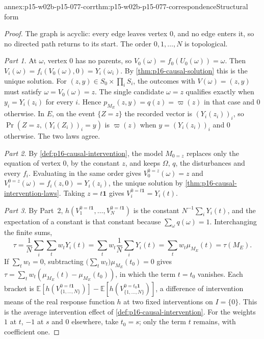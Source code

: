 \begin{annexitem}{annex:p15-w02b-p15-077-corr}{thm:p15-w02b-p15-077-correspondence}{Structural form}
\begin{proof}
The graph is acyclic: every edge leaves vertex \(0\), and no edge enters
it, so no directed path returns to its start. The order
\(0,1,\ldots,N\) is topological.

\emph{Part 1.} At \(\omega\), vertex \(0\) has no parents, so
\(V_0(\omega)=f_0(U_0(\omega))=\omega\). Then
\(V_i(\omega)=f_i(V_0(\omega),0)=Y_i(\omega_i)\). By
\cref{thm:p16-causal-solution} this is the unique solution. For
\((z,y)\in S_0\times\prod_iS_i\), the outcomes with
\(V(\omega)=(z,y)\) must satisfy \(\omega=V_0(\omega)=z\). The single
candidate \(\omega=z\) qualifies exactly when \(y_i=Y_i(z_i)\) for every
\(i\). Hence \(p_{M_E}(z,y)=q(z)=\varpi(z)\) in that case and \(0\)
otherwise. In \(E\), on the event \(\{Z=z\}\) the recorded vector is
\((Y_i(z_i))_i\), so
\(\Pr(Z=z,(Y_i(Z_i))_i=y)\) is \(\varpi(z)\) when
\(y=(Y_i(z_i))_i\) and \(0\) otherwise. The two laws agree.

\emph{Part 2.} By \cref{def:p16-causal-intervention}, the model
\(M_{0=z}\) replaces only the equation of vertex \(0\), by the constant
\(z\), and keeps \(\Omega\), \(q\), the disturbances and every \(f_i\).
Evaluating in the same order gives \(V_0^{0=z}(\omega)=z\) and
\(V_i^{0=z}(\omega)=f_i(z,0)=Y_i(z_i)\), the unique solution by
\cref{thm:p16-causal-intervention-laws}. Taking \(z=t\mathbf 1\) gives
\(V_i^{0=t\mathbf 1}=Y_i(t)\).

\emph{Part 3.} By Part~2,
\(h(V_1^{0=t\mathbf 1},\ldots,V_N^{0=t\mathbf 1})\) is the constant
\(N^{-1}\sum_iY_i(t)\), and the expectation of a constant is that constant
because \(\sum_\omega q(\omega)=1\). Interchanging the finite sums,
\[
 \tau=\frac1N\sum_i\sum_tw_tY_i(t)
     =\sum_tw_t\frac1N\sum_iY_i(t)=\sum_tw_t\mu_{M_E}(t)=\tau(M_E).
\]
If \(\sum_tw_t=0\), subtracting
\(\bigl(\sum_tw_t\bigr)\mu_{M_E}(t_0)=0\) gives
\(\tau=\sum_tw_t(\mu_{M_E}(t)-\mu_{M_E}(t_0))\), in which the term
\(t=t_0\) vanishes. Each bracket is
\(\mathbb E[h(V^{0=t\mathbf 1}_{\{1,\ldots,N\}})]
 -\mathbb E[h(V^{0=t_0\mathbf 1}_{\{1,\ldots,N\}})]\), a difference of
intervention means of the real response function \(h\) at two fixed
interventions on \(I=\{0\}\). This is the average intervention effect of
\cref{def:p16-causal-intervention}. For the weights \(1\) at \(t\),
\(-1\) at \(s\) and \(0\) elsewhere, take \(t_0=s\); only the term
\(t\) remains, with coefficient one.


\end{proof}
\end{annexitem}
